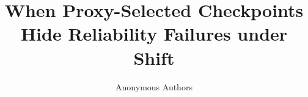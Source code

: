 \documentclass{article}
\title{When Proxy-Selected Checkpoints Hide Reliability Failures under Shift}
\author{Anonymous Authors}
\begin{document}
\maketitle








\FloatBarrier
\clearpage



\appendix

\FloatBarrier

\FloatBarrier

\FloatBarrier
\clearpage

\end{document}
